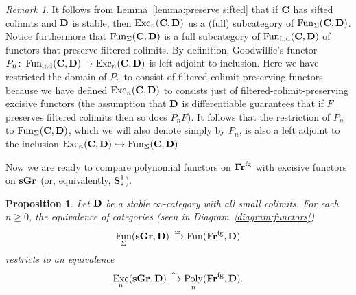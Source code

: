 \documentclass[psamsfonts]{amsart}
\theoremstyle{plain}
\newtheorem{prop}[thm]{Proposition}
\theoremstyle{definition}
\theoremstyle{remark}
\newtheorem{rem}[thm]{Remark}
\newcommand{\catname}[1]{{\normalfont\textbf{#1}}}
\newcommand{\spaces}{\catname{S}_*}
\newcommand{\connected}{\spaces^{1}}
\newcommand{\fr}{\allfr^{\mathrm{fg}}}
\newcommand{\allfr}{\catname{Fr}}
\newcommand{\sgr}{\catname{sGr}}
\DeclareMathOperator{\fun}{Fun}
\DeclareMathOperator{\poly}{Poly}
\DeclareMathOperator{\exc}{Exc}
\begin{document}
\begin{rem}\label{rem:excisive-sifted}
It follows from Lemma~\ref{lemma:preserve sifted} that if $\catname{C}$ has sifted colimits and $\catname{D}$ is stable, then $\exc_n(\catname{C}, \catname{D})$ us a (full) subcategory of $\fun_{\Sigma}(\catname{C}, \catname{D})$. Notice furthermore that $\fun_{\Sigma}(\catname{C}, \catname{D})$ is a full subcategory of $\fun_{\operatorname{ind}}(\catname{C}, \catname{D})$ of functors that preserve filtered colimits. By definition, Goodwillie's functor $P_n\colon \fun_{\operatorname{ind}}(\catname{C}, \catname{D})\to \exc_n(\catname{C}, \catname{D})$ is left adjoint to inclusion. Here we have restricted the domain of $P_n$ to consist of filtered-colimit-preserving functors because we have defined $\exc_n(\catname{C}, \catname{D})$ to consists just of filtered-colimit-preserving excisive functors (the assumption that $\catname{D}$ is differentiable guarantees that if $F$ preserves filtered colimits then so does $P_nF$). It follows that the restriction of $P_n$ to $\fun_{\Sigma}(\catname{C}, \catname{D})$, which we will also denote simply by $P_n$, is also a left adjoint to the inclusion $\exc_n(\catname{C}, \catname{D}) \hookrightarrow \fun_{\Sigma}(\catname{C}, \catname{D})$.
\end{rem}
Now we are ready to compare polynomial functors on $\fr$ with excisive functors on $\sgr$ (or, equivalently, $\connected$).
\begin{prop}\label{prop:poly to exc}
Let $\catname{D}$ be a stable $\infty$-category with all small colimits. For each $n\ge 0$, the equivalence of categories (seen in Diagram~\eqref{diagram:functors})
\[
\fun_{\Sigma}(\sgr, \catname{D}) \xrightarrow{\simeq} \fun(\fr, \catname{D})
\]
restricts to an equivalence
\[
\exc_n(\sgr, \catname{D}) \xrightarrow{\simeq} \poly_n(\fr, \catname{D}).
\]
\end{prop}
\end{document}
